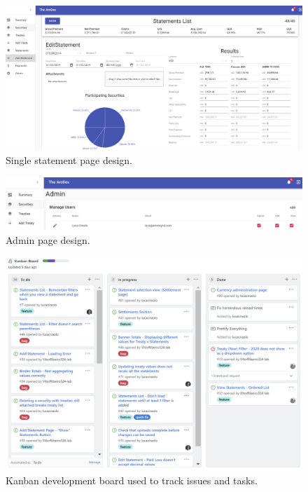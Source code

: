 \documentclass[12pt]{article}
\begin{document}
\begin{figure}[H]
    \includegraphics[width=\linewidth]{statement.png}
    \caption{Single statement page design.}
    \label{fig:statement}
\end{figure}

\begin{figure}[H]
    \includegraphics[width=\linewidth]{admin.png}
    \caption{Admin page design.}
    \label{fig:admin}
\end{figure}



\begin{figure}[H]
    \includegraphics[width=\linewidth]{kanban.png}
    \caption{Kanban development board used to track issues and tasks.}
    \label{fig:kanban}
\end{figure}
\end{document}
